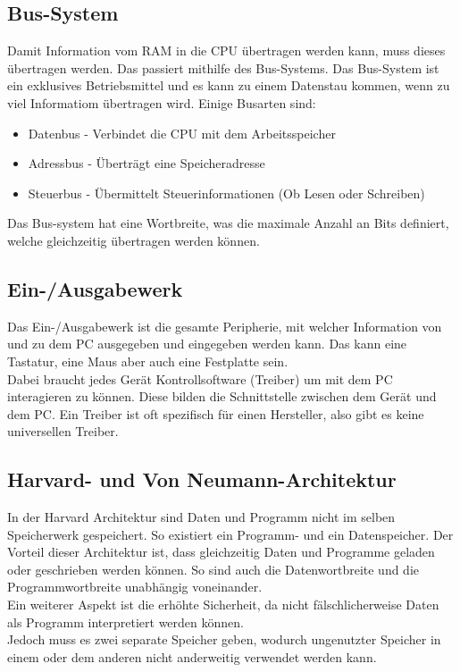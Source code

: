 \documentclass{article}
\begin{document}
		\subsection{Bus-System}
		Damit Information vom RAM in die CPU übertragen werden kann, muss dieses übertragen werden. Das passiert mithilfe des Bus-Systems. Das Bus-System ist ein exklusives Betriebsmittel und es kann zu einem Datenstau kommen, wenn zu viel Informatiom übertragen wird. Einige Busarten sind:
		\begin{itemize}
			\item{Datenbus - Verbindet die CPU mit dem Arbeitsspeicher}
			\item{Adressbus - Überträgt eine Speicheradresse}
			\item{Steuerbus - Übermittelt Steuerinformationen (Ob Lesen oder Schreiben)}
		\end{itemize}
		Das Bus-system hat eine Wortbreite, was die maximale Anzahl an Bits definiert, welche gleichzeitig übertragen werden können.
		\subsection{Ein-/Ausgabewerk}
		Das Ein-/Ausgabewerk ist die gesamte Peripherie, mit welcher Information von und zu dem PC ausgegeben und eingegeben werden kann. Das kann eine Tastatur, eine Maus aber auch eine Festplatte sein.\\
		Dabei braucht jedes Gerät Kontrollsoftware (Treiber) um mit dem PC interagieren zu können. Diese bilden die Schnittstelle zwischen dem Gerät und dem PC. Ein Treiber ist oft spezifisch für einen Hersteller, also gibt es keine universellen Treiber.
		\subsection{Harvard- und Von Neumann-Architektur}
		In der Harvard Architektur sind Daten und Programm nicht im selben Speicherwerk gespeichert. So existiert ein Programm- und ein Datenspeicher. Der Vorteil dieser Architektur ist, dass gleichzeitig Daten und Programme geladen oder geschrieben werden können. So sind auch die Datenwortbreite und die Programmwortbreite unabhängig voneinander. \\
		Ein weiterer Aspekt ist die erhöhte Sicherheit, da nicht fälschlicherweise Daten als Programm interpretiert werden können. \\
		Jedoch muss es zwei separate Speicher geben, wodurch ungenutzter Speicher in einem oder dem anderen nicht anderweitig verwendet werden kann.
\end{document}
